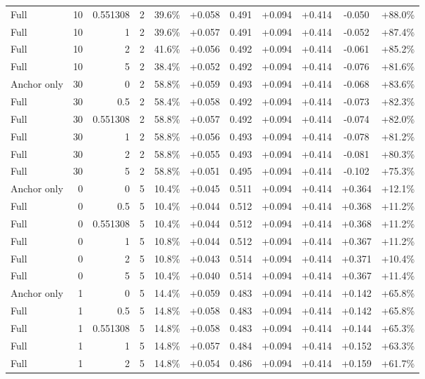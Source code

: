 \begin{table}[htbp]
\begin{tabular}{lrrrccccccc}
Full & 10 & 0.551308 & 2 & 39.6\% & +0.058 & 0.491 & +0.094 & +0.414 & -0.050 & +88.0\% \\
Full & 10 & 1 & 2 & 39.6\% & +0.057 & 0.491 & +0.094 & +0.414 & -0.052 & +87.4\% \\
Full & 10 & 2 & 2 & 41.6\% & +0.056 & 0.492 & +0.094 & +0.414 & -0.061 & +85.2\% \\
Full & 10 & 5 & 2 & 38.4\% & +0.052 & 0.492 & +0.094 & +0.414 & -0.076 & +81.6\% \\
Anchor only & 30 & 0 & 2 & 58.8\% & +0.059 & 0.493 & +0.094 & +0.414 & -0.068 & +83.6\% \\
Full & 30 & 0.5 & 2 & 58.4\% & +0.058 & 0.492 & +0.094 & +0.414 & -0.073 & +82.3\% \\
Full & 30 & 0.551308 & 2 & 58.8\% & +0.057 & 0.492 & +0.094 & +0.414 & -0.074 & +82.0\% \\
Full & 30 & 1 & 2 & 58.8\% & +0.056 & 0.493 & +0.094 & +0.414 & -0.078 & +81.2\% \\
Full & 30 & 2 & 2 & 58.8\% & +0.055 & 0.493 & +0.094 & +0.414 & -0.081 & +80.3\% \\
Full & 30 & 5 & 2 & 58.8\% & +0.051 & 0.495 & +0.094 & +0.414 & -0.102 & +75.3\% \\
Anchor only & 0 & 0 & 5 & 10.4\% & +0.045 & 0.511 & +0.094 & +0.414 & +0.364 & +12.1\% \\
Full & 0 & 0.5 & 5 & 10.4\% & +0.044 & 0.512 & +0.094 & +0.414 & +0.368 & +11.2\% \\
Full & 0 & 0.551308 & 5 & 10.4\% & +0.044 & 0.512 & +0.094 & +0.414 & +0.368 & +11.2\% \\
Full & 0 & 1 & 5 & 10.8\% & +0.044 & 0.512 & +0.094 & +0.414 & +0.367 & +11.2\% \\
Full & 0 & 2 & 5 & 10.8\% & +0.043 & 0.514 & +0.094 & +0.414 & +0.371 & +10.4\% \\
Full & 0 & 5 & 5 & 10.4\% & +0.040 & 0.514 & +0.094 & +0.414 & +0.367 & +11.4\% \\
Anchor only & 1 & 0 & 5 & 14.4\% & +0.059 & 0.483 & +0.094 & +0.414 & +0.142 & +65.8\% \\
Full & 1 & 0.5 & 5 & 14.8\% & +0.058 & 0.483 & +0.094 & +0.414 & +0.142 & +65.8\% \\
Full & 1 & 0.551308 & 5 & 14.8\% & +0.058 & 0.483 & +0.094 & +0.414 & +0.144 & +65.3\% \\
Full & 1 & 1 & 5 & 14.8\% & +0.057 & 0.484 & +0.094 & +0.414 & +0.152 & +63.3\% \\
Full & 1 & 2 & 5 & 14.8\% & +0.054 & 0.486 & +0.094 & +0.414 & +0.159 & +61.7\% \\

\end{tabular}
\end{table}
